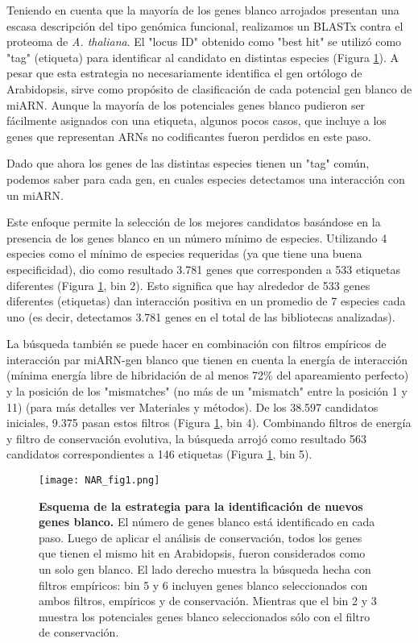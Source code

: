 Teniendo en cuenta que la mayoría de los genes blanco arrojados presentan una escasa descripción del tipo genómica funcional, realizamos un BLASTx  contra el proteoma de \textit{A. thaliana}.
El "locus ID" obtenido como "best hit" se utilizó como "tag" (etiqueta) para identificar al candidato en distintas especies (Figura \ref{fig:NAR_fig1}).
A pesar que esta estrategia no necesariamente identifica el gen ortólogo de Arabidopsis, sirve como propósito de clasificación de cada potencial gen blanco de miARN.
Aunque la mayoría de los potenciales genes blanco pudieron ser fácilmente asignados con una etiqueta, algunos pocos casos, que incluye a los genes que representan ARNs no codificantes fueron perdidos en este paso.

Dado que ahora los genes de las distintas especies tienen un "tag" común, podemos saber para cada gen, en cuales especies detectamos una interacción con un miARN.

Este enfoque permite la selección de los mejores candidatos basándose en la presencia de los genes blanco en un número mínimo de especies.
Utilizando 4 especies como el mínimo de especies requeridas (ya que tiene una buena especificidad), dio como resultado 3.781 genes que corresponden a 533 etiquetas diferentes (Figura \ref{fig:NAR_fig1}, bin 2).
Esto significa que hay alrededor de 533 genes diferentes (etiquetas) dan interacción positiva en un promedio de 7 especies cada uno (es decir, detectamos 3.781 genes en el total de las bibliotecas analizadas).

La búsqueda también se puede hacer en combinación con filtros empíricos de interacción par miARN-gen blanco que tienen en cuenta la energía de interacción (mínima energía libre de hibridación de al menos 72\% del apareamiento perfecto) y la posición de los "mismatches" (no más de un "mismatch" entre la posición 1 y 11) (para más detalles ver Materiales y métodos).
De los 38.597 candidatos iniciales, 9.375 pasan estos filtros (Figura \ref{fig:NAR_fig1}, bin 4).
Combinando filtros de energía y filtro de conservación evolutiva, la búsqueda arrojó como resultado 563 candidatos correspondientes a 146 etiquetas (Figura \ref{fig:NAR_fig1}, bin 5).


\begin{figure}[htbp!] 
    \centering    
    \texttt{[image: NAR\_fig1.png]}
    \caption[Estrategia]{
    \textbf{Esquema de la estrategia para la identificación de nuevos genes blanco.}
    El número de genes blanco está identificado en cada paso. 
    Luego de aplicar el análisis de conservación, todos los genes que tienen el mismo hit en Arabidopsis, fueron considerados como un solo gen blanco. 
    El lado derecho muestra la búsqueda hecha con filtros empíricos: bin 5 y 6 incluyen genes blanco seleccionados con ambos filtros, empíricos y de conservación.
    Mientras que el bin 2 y 3 muestra los potenciales genes blanco seleccionados sólo con el filtro de conservación.}
    \label{fig:NAR_fig1}
\end{figure}

